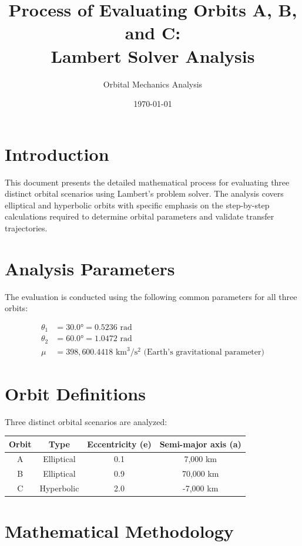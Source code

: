 \documentclass[12pt,a4paper]{article}
\title{\textbf{Process of Evaluating Orbits A, B, and C:\\Lambert Solver Analysis}}
\author{Orbital Mechanics Analysis}
\date{\today}
\begin{document}
\maketitle

\section{Introduction}

This document presents the detailed mathematical process for evaluating three distinct orbital scenarios using Lambert's problem solver. The analysis covers elliptical and hyperbolic orbits with specific emphasis on the step-by-step calculations required to determine orbital parameters and validate transfer trajectories.

\section{Analysis Parameters}

The evaluation is conducted using the following common parameters for all three orbits:

\begin{align}
\theta_1 &= 30.0° = 0.5236 \text{ rad} \\
\theta_2 &= 60.0° = 1.0472 \text{ rad} \\
\mu &= 398,600.4418 \text{ km}^3/\text{s}^2 \text{ (Earth's gravitational parameter)}
\end{align}

\section{Orbit Definitions}

Three distinct orbital scenarios are analyzed:

\begin{center}
\begin{tabular}{cccc}
\toprule
\textbf{Orbit} & \textbf{Type} & \textbf{Eccentricity (e)} & \textbf{Semi-major axis (a)} \\
\midrule
A & Elliptical & 0.1 & 7,000 km \\
B & Elliptical & 0.9 & 70,000 km \\
C & Hyperbolic & 2.0 & -7,000 km \\
\bottomrule
\end{tabular}
\end{center}

\section{Mathematical Methodology}
\end{document}

